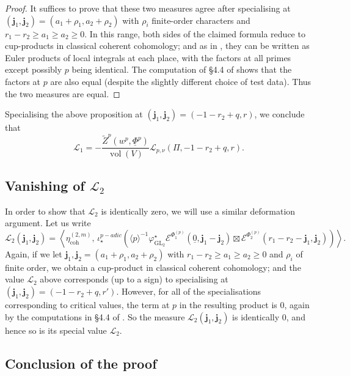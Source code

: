 \documentclass[cjm]{ipart}
\theoremstyle{plain}
\theoremstyle{remark}
\DeclareMathOperator{\coh}{coh}
\DeclareMathOperator{\GL}{GL}
\DeclareMathOperator{\vol}{vol}
\newcommand{\bfj}{\mathbf{j}}
\newcommand{\cE}{\mathcal{E}}
\newcommand{\cL}{\mathcal{L}}
\newcommand{\sL}{\mathscr{L}}
\newcommand{\uPhi}{\underline{\Phi}}
\newcommand{\wZ}{\widetilde{Z}}
\numberwithin{equation}{subsection}
\renewcommand{\ge}{\geqslant}
\begin{document}
  \begin{proof}
   It suffices to prove that these two measures agree after specialising at $(\bfj_1, \bfj_2) = (a_1 + \rho_1, a_2 + \rho_2)$ with $\rho_i$ finite-order characters and $r_1 -r_2 \ge a_1 \ge a_2 \ge 0$. In this range, both sides of the claimed formula reduce to cup-products in classical coherent cohomology; and as in \cite{LPSZ1}, they can be written as Euler products of local integrals at each place, with the factors at all primes except possibly $p$ being identical. The computation of \S 4.4 of \cite{LZ-equivar} shows that the factors at $p$ are also equal (despite the slightly different choice of test data). Thus the two measures are equal.
  \end{proof}

  Specialising the above proposition at $(\bfj_1, \bfj_2) =  (-1-r_2 + q, r)$, we conclude that
  \[ \sL_1 = -\frac{\wZ^p(w^p, \uPhi^p)}{\vol(V)} \cL_{p, \nu}(\Pi, -1-r_2 + q, r) .\]

  \subsection{Vanishing of $\sL_2$}
   \label{sect:sL2vanishing}

   In order to show that $\sL_2$ is identically zero, we will use a similar deformation argument. Let us write
   \[
    \sL_2(\bfj_1, \bfj_2) = \left\langle\eta^{(2,m)}_{\coh},\, \iota_\star^{p-adic}\left(\langle p\rangle^{-1}\varphi_{\GL_2}^\star \cE^{\Phi_1^{(p)}}(\underline{0}, \bfj_1 - \bfj_2)\boxtimes \cE^{\Phi_2^{(p)}}(r_1-r_2-\bfj_1, \bfj_2)\right)\right\rangle.
   \]
   Again, if we let $\bfj_1, \bfj_2 = (a_1 + \rho_1, a_2 + \rho_2)$ with $r_1 -r_2 \ge a_1 \ge a_2 \ge 0$ and $\rho_i$ of finite order, we obtain a cup-product in classical coherent cohomology; and the  value $\sL_2$ above corresponds (up to a sign) to specialising at $(\bfj_1, \bfj_2) = (-1-r_2 + q, r')$. However, for all of the specialisations corresponding to critical values, the term at $p$ in the resulting product is 0, again by the computations in \S 4.4 of \cite{LZ-equivar}. So the measure $\sL_2(\bfj_1, \bfj_2)$ is identically 0, and hence so is its special value $\sL_2$.


  \subsection{Conclusion of the proof}
\end{document}
